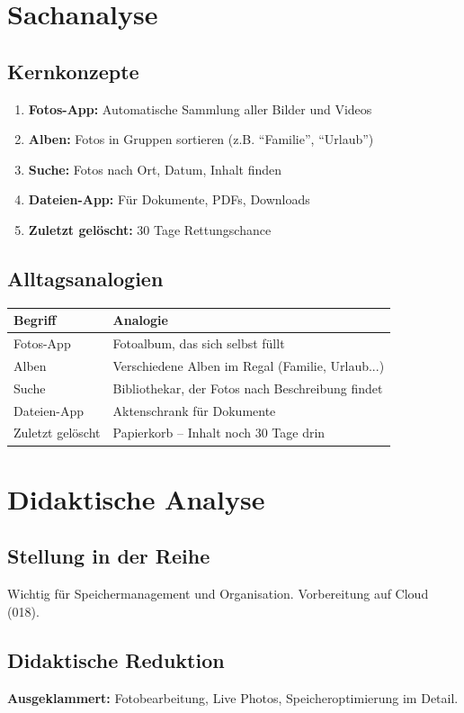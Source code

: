 \documentclass[11pt,a4paper]{article}
\begin{document}
\section{Sachanalyse}

\subsection{Kernkonzepte}
\begin{enumerate}
    \item \textbf{Fotos-App:} Automatische Sammlung aller Bilder und Videos
    \item \textbf{Alben:} Fotos in Gruppen sortieren (z.B. ``Familie'', ``Urlaub'')
    \item \textbf{Suche:} Fotos nach Ort, Datum, Inhalt finden
    \item \textbf{Dateien-App:} Für Dokumente, PDFs, Downloads
    \item \textbf{Zuletzt gelöscht:} 30 Tage Rettungschance
\end{enumerate}

\subsection{Alltagsanalogien}
\begin{tabular}{|l|p{8cm}|}
\hline
\textbf{Begriff} & \textbf{Analogie} \\
\hline
Fotos-App & Fotoalbum, das sich selbst füllt \\
Alben & Verschiedene Alben im Regal (Familie, Urlaub...) \\
Suche & Bibliothekar, der Fotos nach Beschreibung findet \\
Dateien-App & Aktenschrank für Dokumente \\
Zuletzt gelöscht & Papierkorb -- Inhalt noch 30 Tage drin \\
\hline
\end{tabular}

\section{Didaktische Analyse}

\subsection{Stellung in der Reihe}
Wichtig für Speichermanagement und Organisation. Vorbereitung auf Cloud (018).

\subsection{Didaktische Reduktion}
\textbf{Ausgeklammert:} Fotobearbeitung, Live Photos, Speicheroptimierung im Detail.
\end{document}
